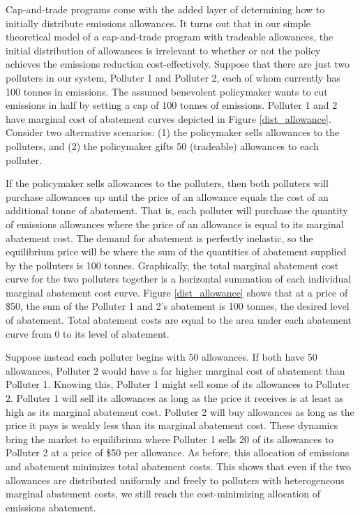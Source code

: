 Cap-and-trade programs come with the added layer of determining how to initially distribute emissions allowances. It turns out that in our simple theoretical model of a cap-and-trade program with tradeable allowances, the initial distribution of allowances is irrelevant to whether or not the policy achieves the emissions reduction cost-effectively. Suppose that there are just two polluters in our system, Polluter 1 and Polluter 2, each of whom currently has 100 tonnes in emissions. The assumed benevolent policymaker wants to cut emissions in half by setting a cap of 100 tonnes of emissions. Polluter 1 and 2 have marginal cost of abatement curves depicted in Figure \ref{dist_allowance}. Consider two alternative scenarios: (1) the policymaker sells allowances to the polluters, and (2) the policymaker gifts 50 (tradeable) allowances to each polluter. 

If the policymaker sells allowances to the polluters, then both polluters will purchase allowances up until the price of an allowance equals the cost of an additional tonne of abatement. That is, each polluter will purchase the quantity of emissions allowances where the price of an allowance is equal to its marginal abatement cost. The demand for abatement is perfectly inelastic, so the equilibrium price will be where the sum of the quantities of abatement supplied by the polluters is 100 tonnes. Graphically, the total marginal abatement cost curve for the two polluters together is a horizontal summation of each individual marginal abatement cost curve. Figure \ref{dist_allowance} shows that at a price of \$50, the sum of the Polluter 1 and 2's abatement is 100 tonnes, the desired level of abatement. Total abatement costs are equal to the area under each abatement curve from 0 to its level of abatement. 

Suppose instead each polluter begins with 50 allowances. If both have 50 allowances, Polluter 2 would have a far higher marginal cost of abatement than Polluter 1. Knowing this, Polluter 1 might sell some of its allowances to Polluter 2. Polluter 1 will sell its allowances as long as the price it receives is at least as high as its marginal abatement cost. Polluter 2 will buy allowances as long as the price it pays is weakly less than its marginal abatement cost. These dynamics bring the market to equilibrium where Polluter 1 sells 20 of its allowances to Polluter 2 at a price of \$50 per allowance. As before, this allocation of emissions and abatement minimizes total abatement costs. This shows that even if the two allowances are distributed uniformly and freely to polluters with heterogeneous marginal abatement costs, we still reach the cost-minimizing allocation of emissions abatement. 

